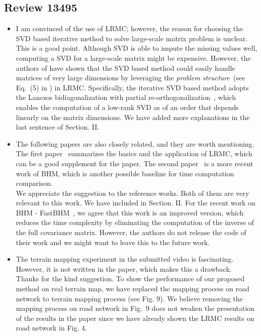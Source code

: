 \documentclass{article}
\newcommand{\response}[1]{{\color{black}\smallskip\\ #1 }}
\begin{document}
\subsection*{Review 13495}
{\color{blue}
    \begin{itemize}
        \item
        I am convinced of the use of LRMC; however, the reason for choosing the SVD based
        iterative method to solve large-scale matrix problem is unclear.
        \response{This is a good point. Although SVD is able to impute the missing values well, computing a SVD for a large-scale matrix might be expensive. However, the authors of \cite{mazumder2010spectral} have shown that the SVD based method could easily handle matrices of very large dimensions by leveraging the \textit{problem structure}~(see Eq.~(5) in \cite{mazumder2010spectral}) in LRMC. Specifically, the iterative SVD based method adopts the Lanczos bidiagonalization with partial re-orthogonalization~\cite{larsen1998lanczos}, which enables the computation of a low-rank SVD as of an order that depends linearly on the matrix dimensions. We have added more explanations in the last sentence of Section. II.
        }
        
        \item
        The following papers are also closely related, and
        they are worth mentioning. The first paper~\cite{nguyen2019low} summarizes the
        basics and the application of LRMC, which can be a good
        supplement for the paper. The second paper~\cite{zhi2019continuous} is a more recent work of BHM, which is another possible baseline for time
        computation comparison.
        \response{ We appreciate the suggestion to the reference works. Both of them are very relevant to this work. We have included \cite{nguyen2019low} in Section. II. For the recent work on BHM - FastBHM~\cite{zhi2019continuous}, we agree that this work is an improved version, which reduces the time complexity by eliminating the computation of the inverse of the full covariance matrix. However, the authors do not release the code of their work and we might want to leave this to the future work.
        }
        
        \item
        The terrain mapping
        experiment in the submitted video is fascinating. However,
        it is not written in the paper, which makes this a
        drawback.
        \response{ Thanks for the kind suggestion. To show the performance of our proposed method on real terrain map, we have replaced the mapping process on road network to terrain mapping process (see Fig. 9). We believe removing the mapping process on road network in Fig.~9 does not weaken the presentation of the results in the paper since we have already shown the LRMC results on road network in Fig. 4.
        }
        

\end{itemize}}
\end{document}
